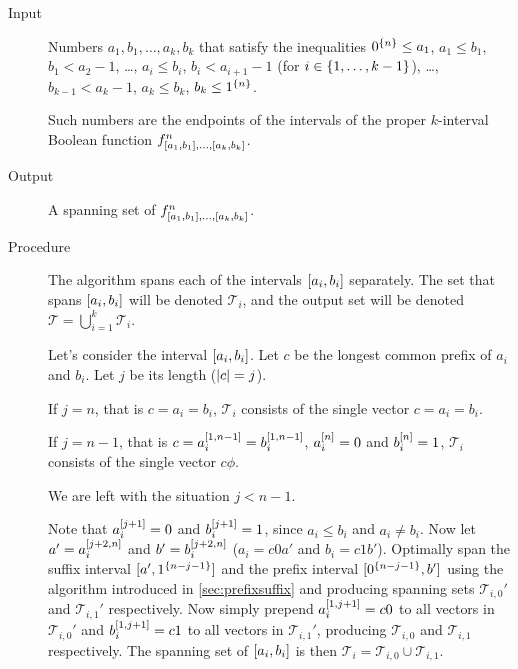 \begin{description}
\item[Input] Numbers $a_1, b_1, \ldots, a_k, b_k$
that satisfy the inequalities
$0^{\{n\}} \leq a_1$,
$a_1 \leq b_1$,
$b_1 < a_2 - 1$,
\ldots,
$a_i \leq b_i$,
$b_i < a_{i+1} - 1$
(for $i \in \{1, \ldots, k-1\}$),
\ldots,
$b_{k-1} < a_k - 1$,
$a_k \leq b_k$,
$b_k \leq 1^{\{n\}}$.

Such numbers are the endpoints of the intervals
of the proper $k$-interval Boolean function $f^{n}_{[a_1, b_1], \ldots, [a_{k}, b_{k}]}$.

\item[Output] A spanning set of $f^{n}_{[a_1, b_1], \ldots, [a_{k}, b_{k}]}$.

\item[Procedure]
The algorithm spans each of
the intervals $[a_i, b_i]$ separately.
The set that spans $[a_i, b_i]$ will be denoted
$\mathcal{T}_i$,
and the output set will be denoted
$\mathcal{T} = \bigcup_{i=1}^k{\mathcal{T}_i}$.

Let's consider the interval $[a_i, b_i]$.
Let $c$ be the longest common prefix of $a_i$ and $b_i$.
Let $j$ be its length ($\lvert c\rvert = j$).

If $j = n$, that is $c = a_i = b_i$,
$\mathcal{T}_i$ consists of the single vector
$c = a_i = b_i$.

If $j = n-1$,
that is $c = a_i^{[1, n-1]} = b_i^{[1, n-1]}$,
$a_i^{[n]} = 0$ and $b_i^{[n]} = 1$,
$\mathcal{T}_i$ consists of the single vector
$c \phi$.

We are left with the situation $j < n-1$.

Note that $a_i^{[j+1]} = 0$ and $b_i^{[j+1]} = 1$,
since $a_i \leq b_i$ and $a_i \neq b_i$.
Now let $a' = a_i^{[j+2, n]}$
and $b' = b_i^{[j+2, n]}$
($a_i = c 0 a'$ and $b_i = c 1 b'$).
Optimally span the suffix interval
$[a', 1^{\{n-j-1\}}]$
and the prefix interval
$[0^{\{n-j-1\}}, b']$
using the
algorithm
introduced in \autoref{sec:prefixsuffix}
and producing spanning sets
$\mathcal{T}_{i, 0}'$
and $\mathcal{T}_{i, 1}'$ respectively.
Now simply prepend $a_i^{[1, j+1]} = c 0$
to all vectors in $\mathcal{T}_{i, 0}'$
and $b_i^{[1, j+1]} = c 1$
to all vectors in $\mathcal{T}_{i, 1}'$,
producing $\mathcal{T}_{i, 0}$
and $\mathcal{T}_{i, 1}$ respectively.
The spanning set of $[a_i, b_i]$
is then
$\mathcal{T}_i
= \mathcal{T}_{i, 0} \cup \mathcal{T}_{i, 1}$.
\end{description}

